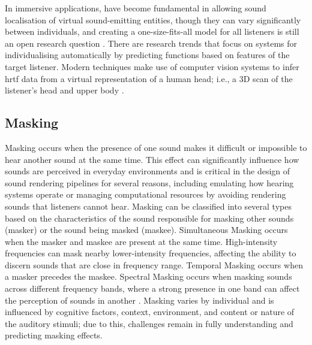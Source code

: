 In immersive applications,  have become fundamental in allowing sound localisation of virtual sound-emitting entities, though they can vary significantly between individuals, and creating a one-size-fits-all model for all listeners is still an open research question \citep{plugnplayAuralisations}.
There are research trends that focus on systems for individualising  automatically by predicting functions based on features of the target listener. Modern techniques make use of computer vision systems to infer \acrshort{hrtf} data from a virtual representation of a human head; i.e., a 3D scan of the listener's head and upper body \citep{zotkin2003hrtf}.

\subsection{Masking}
Masking occurs when the presence of one sound makes it difficult or impossible to hear another sound at the same time. This effect can significantly influence how sounds are perceived in everyday environments and is critical in the design of sound rendering pipelines for several reasons, including emulating how hearing systems operate or managing computational resources by avoiding rendering sounds that listeners cannot hear.
Masking can be classified into several types based on the characteristics of the sound responsible for masking other sounds (masker) or the sound being masked (maskee). Simultaneous Masking occurs when the masker and maskee are present at the same time. High-intensity frequencies can mask nearby lower-intensity frequencies, affecting the ability to discern sounds that are close in frequency range. Temporal Masking occurs when a masker precedes the maskee. Spectral Masking occurs when masking sounds across different frequency bands, where a strong presence in one band can affect the perception of sounds in another \citep{howard2013acoustics}.
Masking varies by individual and is influenced by cognitive factors, context, environment, and content or nature of the auditory stimuli; due to this, challenges remain in fully understanding and predicting masking effects.

